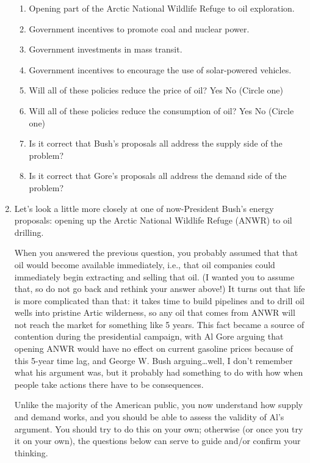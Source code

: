 \begin{enumerate}
    \begin{enumerate}
    \item Opening part of the Arctic National Wildlife Refuge to oil exploration.
    \item Government incentives to promote coal and nuclear power.
    \item Government investments in mass transit.
    \item Government incentives to encourage the use of solar-powered vehicles.
    \item Will all of these policies reduce the price of oil? Yes  No (Circle one)
    \item Will all of these policies reduce the consumption of oil? Yes  No (Circle one)
    \item Is it correct that Bush's proposals all address the supply side of the problem? %
    \item Is it correct that Gore's proposals all address the demand side of the problem? %
    \end{enumerate}







\item Let's look a little more closely at one of now-President Bush's energy proposals: opening up the Arctic National Wildlife Refuge (ANWR) to oil drilling.

When you answered the previous question, you probably assumed that that oil would become available immediately, i.e., that oil companies could immediately begin extracting and selling that oil. (I wanted you to assume that, so do not go back and rethink your answer above!) It turns out that life is more complicated than that: it takes time to build pipelines and to drill oil wells into pristine Artic wilderness, so any oil that comes from ANWR will not reach the market for something like 5 years. This fact became a source of contention during the presidential campaign, with Al Gore arguing that opening ANWR would have no effect on current gasoline prices because of this 5-year time lag, and George W. Bush arguing\ldots well, I don't remember what his argument was, but it probably had something to do with how when people take actions there have to be consequences.

Unlike the majority of the American public, you now understand how supply and demand works, and you should be able to assess the validity of Al's argument. You should try to do this on your own; otherwise (or once you try it on your own), the questions below can serve to guide and/or confirm your thinking.


\end{enumerate}
